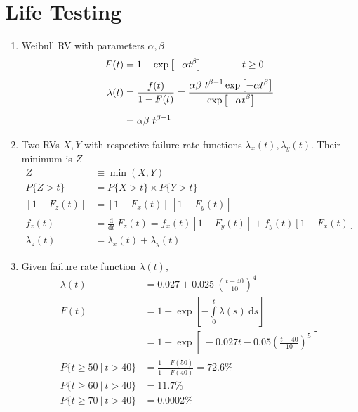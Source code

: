 \chapter{Life Testing}

\begin{enumerate}

	\item Weibull RV with parameters \(\alpha, \beta\)
	\begin{align}
		F(t) &= 1 - \exp \left[  -\alpha t^{\beta}  \right] \qquad \qquad t \geq 0 \nonumber \\[1ex]
		\lambda(t) &= \frac{\displaystyle f(t)}{\displaystyle 1 - F(t)} = \frac{\displaystyle \alpha \beta \ t^{\beta - 1} \exp \left[  -\alpha t^{\beta}  \right] }{\displaystyle  \exp \left[  -\alpha t^{\beta}  \right] } \nonumber\\[1ex]
		&= \alpha \beta \ t^{\beta - 1}
	\end{align}

	\item Two RVs \(X, Y\) with respective failure rate functions \(\lambda_x (t), \lambda_y (t)\). Their minimum is \(Z\)
	\begin{align}
		Z &\equiv \min (X, Y) \nonumber \\
		P\{Z > t\} &= P\{X > t\} \times P\{Y > t\} \\
		\left[ 1 - F_z (t) \right] &= \left[ 1 - F_x (t) \right]\ \left[ 1 - F_y (t) \right] \nonumber \\
		f_z (t) &= \frac{\mathrm{d}}{\mathrm{d}t}\ F_z (t) = f_x (t)\left[ 1 - F_y (t) \right] + f_y (t) \left[ 1 - F_x (t) \right] \\
		\lambda_z (t) &= \lambda_x (t) + \lambda_y (t)
	\end{align}

	\item Given failure rate function \(\lambda (t)\),
	\begin{align}
		\lambda (t) &= 0.027 + 0.025 \ \left( \frac{t - 40}{10} \right)^4 \\
		F(t) &= 1 - \exp \left[ -\int\limits_0^t \lambda(s) \ \mathrm{d}s \right]  \nonumber \\
		&= 1 - \exp \left[\ -0.027 t - 0.05 \left( \frac{t - 40}{10} \right)^5 \ \right] \nonumber \\
		P\{t \geq 50\ |\ t > 40\} &= \frac{1 - F(50)}{1 - F(40)} = 72.6\% \\
		P\{t \geq 60\ |\ t > 40\} &= 11.7\% \\
		P\{t \geq 70\ |\ t > 40\} &= 0.0002\% \\
	\end{align}


\end{enumerate}
